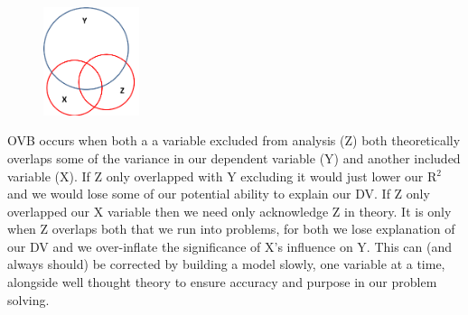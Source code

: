 \documentclass[12pt]{article}\usepackage[]{graphicx}\usepackage[]{color}
\begin{document}
\begin{figure}
\centering
\includegraphics[width=0.25\textwidth]{OVB}
\end{figure}
OVB occurs when both a a variable excluded from analysis (Z) both theoretically overlaps some of the variance in our dependent variable (Y) and another included variable (X). If Z only overlapped with Y excluding it would just lower our R$^2$ and we would lose some of our potential ability to explain our DV. If Z only overlapped our X variable then we need only acknowledge Z in theory. It is only when Z overlaps both that we run into problems, for both we lose explanation of our DV and we over-inflate the significance of X's influence on Y. This can (and always should) be corrected by building a model slowly, one variable at a time, alongside well thought theory to ensure accuracy and purpose in our problem solving.
\end{document}
